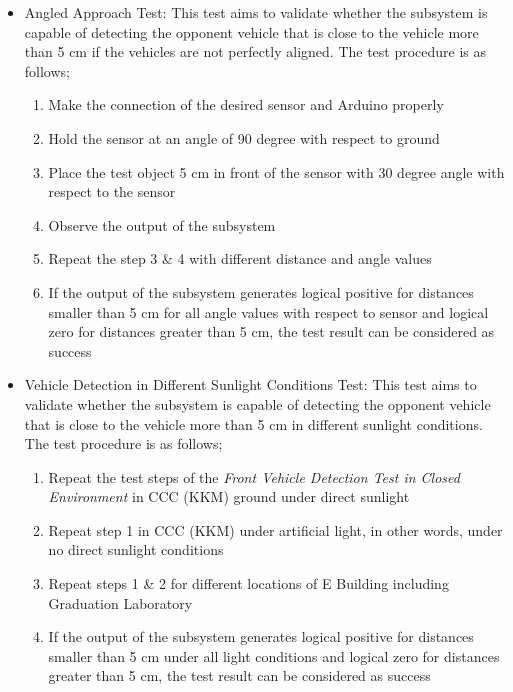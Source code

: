 \documentclass[a4paper,12pt]{article}
\begin{document}
\begin{itemize}
		\item Angled Approach Test:
			This test aims to validate whether the subsystem is capable of detecting the opponent vehicle that is close to the vehicle more than 5 cm if the vehicles are not perfectly aligned. The test procedure is as follows;
			\begin{enumerate}
				\item Make the connection of the desired sensor and Arduino properly \vspace{-0.2cm}
				\item Hold the sensor at an angle of 90 degree with respect to ground \vspace{-0.2cm}
				\item Place the test object 5 cm in front of the sensor with 30 degree angle with respect to the sensor \vspace{-0.2cm}
				\item Observe the output of the subsystem \vspace{-0.2cm}
				\item Repeat the step 3 \& 4 with different distance and angle values \vspace{-0.2cm}
				\item If the output of the subsystem generates logical positive for distances smaller than 5 cm for all angle values with respect to sensor and logical zero for distances greater than 5 cm, the test result can be considered as success \vspace{-0.2cm}
			\end{enumerate}
		
		\item Vehicle Detection in Different Sunlight Conditions Test:
			This test aims to validate whether the subsystem is capable of detecting the opponent vehicle that is close to the vehicle more than 5 cm in different sunlight conditions. The test procedure is as follows; 		
			\begin{enumerate}
				\item Repeat the test steps of the \textit{Front Vehicle Detection Test in Closed Environment} in CCC (KKM) ground under direct sunlight \vspace{-0.2cm}
				\item Repeat step 1 in CCC (KKM) under artificial light, in other words, under no direct sunlight conditions \vspace{-0.2cm}
				\item Repeat steps 1 \& 2 for different locations of E Building including Graduation Laboratory \vspace{-0.2cm}
				\item If the output of the subsystem generates logical positive for distances smaller than 5 cm under all light conditions and logical zero for distances greater than 5 cm, the test result can be considered as success \vspace{-0.2cm}
			\end{enumerate}
			
		\end{itemize}
	
\end{document}
